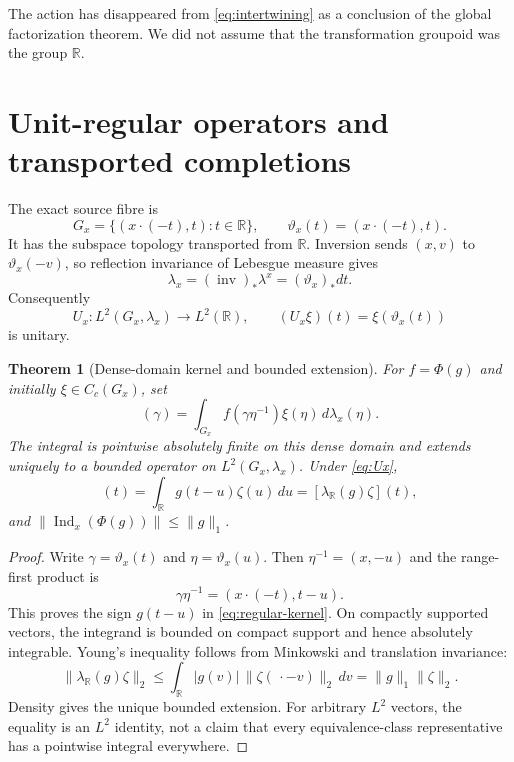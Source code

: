 \documentclass[11pt]{article}
\newtheorem{theorem}{Theorem}[section]
\theoremstyle{definition}
\newcommand{\R}{\mathbb R}
\newcommand{\Ind}{\operatorname{Ind}}
\begin{document}
The action has disappeared from \cref{eq:intertwining} as a conclusion of
the global factorization theorem.  We did not assume that the transformation
groupoid was the group $\R$.

\section{Unit-regular operators and transported completions}
\label{sec:regular}

The exact source fibre is
\begin{equation}
 G_x=\{(x\cdot(-t),t):t\in\R\},\qquad
 \vartheta_x(t)=(x\cdot(-t),t).
 \label{eq:source-fibre}
\end{equation}
It has the subspace topology transported from $\R$.  Inversion sends
$(x,v)$ to $\vartheta_x(-v)$, so reflection invariance of Lebesgue measure
gives
\begin{equation}
 \lambda_x=(\operatorname{inv})_*\lambda^x=(\vartheta_x)_*dt.
 \label{eq:source-measure}
\end{equation}
Consequently
\begin{equation}
 U_x:L^2(G_x,\lambda_x)\to L^2(\R),\qquad
 (U_x\xi)(t)=\xi(\vartheta_x(t))
 \label{eq:Ux}
\end{equation}
is unitary.

\begin{theorem}[Dense-domain kernel and bounded extension]
\label{thm:regular}
For $f=\Phi(g)$ and initially $\xi\in C_c(G_x)$, set
\begin{equation}
 [\Ind_x(f)\xi](\gamma)=
 \int_{G_x}f(\gamma\eta^{-1})\xi(\eta)\,d\lambda_x(\eta).
 \label{eq:Ind}
\end{equation}
The integral is pointwise absolutely finite on this dense domain and extends
uniquely to a bounded operator on $L^2(G_x,\lambda_x)$.  Under \cref{eq:Ux},
\begin{equation}
 [U_x\Ind_x(\Phi(g))U_x^{-1}\zeta](t)
 =\int_{\R} g(t-u)\zeta(u)\,du
 =[\lambda_{\R}(g)\zeta](t),
 \label{eq:regular-kernel}
\end{equation}
and $\|\Ind_x(\Phi(g))\|\le\|g\|_1$.
\end{theorem}

\begin{proof}
Write $\gamma=\vartheta_x(t)$ and $\eta=\vartheta_x(u)$.  Then
$\eta^{-1}=(x,-u)$ and the range-first product is
\[
 \gamma\eta^{-1}=(x\cdot(-t),t-u).
\]
This proves the sign $g(t-u)$ in \cref{eq:regular-kernel}.  On compactly
supported vectors, the integrand is bounded on compact support and hence
absolutely integrable.  Young's inequality follows from Minkowski and
translation invariance:
\[
 \|\lambda_{\R}(g)\zeta\|_2
 \le\int_{\R}|g(v)|\,\|\zeta(\,\cdot-v)\|_2\,dv
 =\|g\|_1\|\zeta\|_2.
\]
Density gives the unique bounded extension.  For arbitrary $L^2$ vectors,
the equality is an $L^2$ identity, not a claim that every equivalence-class
representative has a pointwise integral everywhere.
\end{proof}
\end{document}
